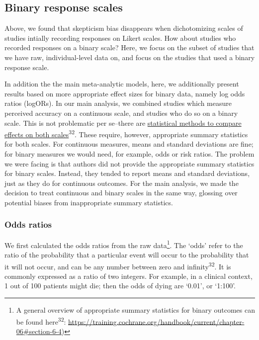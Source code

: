 \documentclass[
  doc,floatsintext]{apa6}
\begin{document}
\subsection{Binary response scales}\label{binary-response-scales}

Above, we found that skepticism bias disappears when dichotomizing scales of studies intially recording responses on Likert scales. How about studies who recorded responses on a binary scale? Here, we focus on the subset of studies that we have raw, individual-level data on, and focus on the studies that used a binary response scale.

In addition the the main meta-analytic models, here, we additionally present results based on more appropriate effect sizes for binary data, namely log odds ratios (logORs). In our main analysis, we combined studies which measure perceived accuracy on a continuous scale, and studies who do so on a binary scale. This is not problematic per se--there are \href{https://training.cochrane.org/handbook/current/chapter-10\#section-10-6}{statistical methods to compare effects on both scales}\textsuperscript{32}. These require, however, appropriate summary statistics for both scales. For continuous measures, means and standard deviations are fine; for binary measures we would need, for example, odds or risk ratios. The problem we were facing is that authors did not provide the appropriate summary statistics for binary scales. Instead, they tended to report means and standard deviations, just as they do for continuous outcomes. For the main analysis, we made the decision to treat continuous and binary scales in the same way, glossing over potential biases from inappropriate summary statistics.

\subsubsection{Odds ratios}\label{odds-ratios}

We first calculated the odds ratios from the raw data\footnote{A general overview of appropriate summary statistics for binary outcomes can be found here\textsuperscript{32}: \url{https://training.cochrane.org/handbook/current/chapter-06\#section-6-4})}. The `odds' refer to the ratio of the probability that a particular event will occur to the probability that it will not occur, and can be any number between zero and infinity\textsuperscript{32}. It is commonly expressed as a ratio of two integers. For example, in a clinical context, 1 out of 100 patients might die; then the odds of dying are `0.01', or `1:100'.
\end{document}
